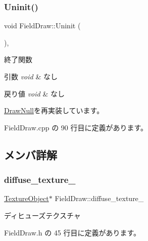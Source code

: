 \subsubsection{\texorpdfstring{Uninit()}{Uninit()}}
{\footnotesize\ttfamily void Field\+Draw\+::\+Uninit (\begin{DoxyParamCaption}{ }\end{DoxyParamCaption})\hspace{0.3cm}{\ttfamily [override]}, {\ttfamily [virtual]}}



終了関数 


\begin{DoxyParams}{引数}
{\em void} & なし \\
\hline
\end{DoxyParams}

\begin{DoxyRetVals}{戻り値}
{\em void} & なし \\
\hline
\end{DoxyRetVals}


\mbox{\hyperlink{class_draw_null_a6e81d63efab7333e8d0e8af99362a4d9}{Draw\+Null}}を再実装しています。



 Field\+Draw.\+cpp の 90 行目に定義があります。



\subsection{メンバ詳解}
\mbox{\label{class_field_draw_aae75fe96d822d266a44815520f6ab3dc}} 
\subsubsection{\texorpdfstring{diffuse\+\_\+texture\+\_\+}{diffuse\_texture\_}}
{\footnotesize\ttfamily \mbox{\hyperlink{class_texture_object}{Texture\+Object}}$\ast$ Field\+Draw\+::diffuse\+\_\+texture\+\_\+\hspace{0.3cm}{\ttfamily [private]}}



ディヒューズテクスチャ 



 Field\+Draw.\+h の 45 行目に定義があります。

